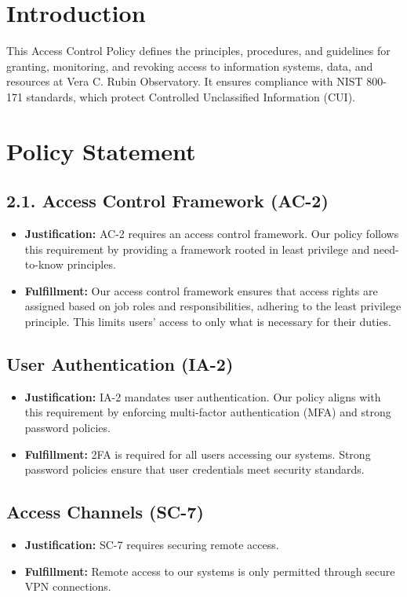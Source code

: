 \section{Introduction}
This Access Control Policy defines the principles, procedures, and guidelines for granting, monitoring, and revoking access to information systems, data, and resources at Vera C. Rubin Observatory. It ensures compliance with NIST 800-171 standards, which protect Controlled Unclassified Information (CUI).

\section{Policy Statement}
\subsection*{2.1. Access Control Framework (AC-2)}
\begin{itemize}
    \item \textbf{Justification:} AC-2 requires an access control framework. Our policy follows this requirement by providing a framework rooted in least privilege and need-to-know principles.
    \item \textbf{Fulfillment:} Our access control framework ensures that access rights are assigned based on job roles and responsibilities, adhering to the least privilege principle. This limits users' access to only what is necessary for their duties.
\end{itemize}

\subsection{User Authentication (IA-2)}
\begin{itemize}
    \item \textbf{Justification:} IA-2 mandates user authentication. Our policy aligns with this requirement by enforcing multi-factor authentication (MFA) and strong password policies.
    \item \textbf{Fulfillment:} 2FA is required for all users accessing our systems. Strong password policies ensure that user credentials meet security standards.
\end{itemize}

\subsection{Access Channels (SC-7)}
\begin{itemize}
    \item \textbf{Justification:} SC-7 requires securing remote access. 
    \item \textbf{Fulfillment:} Remote access to our systems is only permitted through secure VPN connections. 
\end{itemize}

